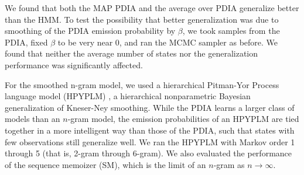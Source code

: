 We found that both the MAP PDIA and the average over PDIA generalize better than the HMM.  To test the possibility that better generalization was due to smoothing of the PDIA emission probability by $\beta$, we took samples from the PDIA, fixed $\beta$ to be very near 0, and ran the MCMC sampler as before.  We found that neither the average number of states nor the generalization performance was significantly affected.

For the smoothed n-gram model, we used a hierarchical Pitman-Yor Process language model (HPYPLM) \cite{Teh}, a hierarchical nonparametric Bayesian generalization of Kneser-Ney smoothing.  While the PDIA learns a larger class of models than an $n$-gram model, the emission probabilities of an HPYPLM are tied together in a more intelligent way than those of the PDIA, such that states with few observations still generalize well.  We ran the HPYPLM with Markov order 1 through 5 (that is, 2-gram through 6-gram).  We also evaluated the performance of the sequence memoizer (SM), which is the limit of an $n$-gram as $n\rightarrow\infty$.
